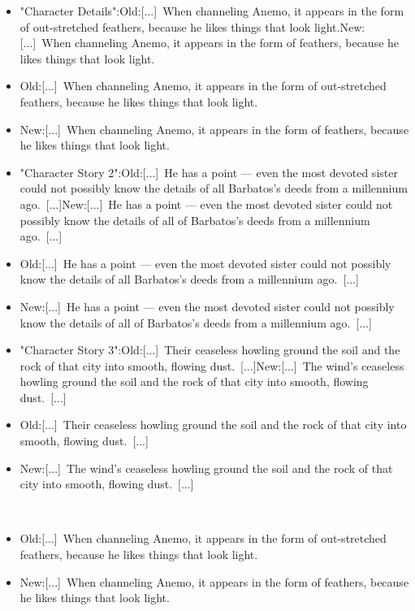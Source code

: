 \documentclass[a4paper,12pt]{article}
\begin{document}
\begin{itemize}
\item "Character Details":Old:[...] When channeling Anemo, it appears in the form of out-stretched feathers, because he likes things that look light.New:[...] When channeling Anemo, it appears in the form of feathers, because he likes things that look light.
\item Old:[...] When channeling Anemo, it appears in the form of out-stretched feathers, because he likes things that look light.
\item New:[...] When channeling Anemo, it appears in the form of feathers, because he likes things that look light.
\item "Character Story 2":Old:[...] He has a point — even the most devoted sister could not possibly know the details of all Barbatos's deeds from a millennium ago. [...]New:[...] He has a point — even the most devoted sister could not possibly know the details of all of Barbatos's deeds from a millennium ago. [...]
\item Old:[...] He has a point — even the most devoted sister could not possibly know the details of all Barbatos's deeds from a millennium ago. [...]
\item New:[...] He has a point — even the most devoted sister could not possibly know the details of all of Barbatos's deeds from a millennium ago. [...]
\item "Character Story 3":Old:[...] Their ceaseless howling ground the soil and the rock of that city into smooth, flowing dust. [...]New:[...] The wind's ceaseless howling ground the soil and the rock of that city into smooth, flowing dust. [...]
\item Old:[...] Their ceaseless howling ground the soil and the rock of that city into smooth, flowing dust. [...]
\item New:[...] The wind's ceaseless howling ground the soil and the rock of that city into smooth, flowing dust. [...]
\end{itemize}\\ \par \vspace{0.5cm}

\begin{itemize}
\item Old:[...] When channeling Anemo, it appears in the form of out-stretched feathers, because he likes things that look light.
\item New:[...] When channeling Anemo, it appears in the form of feathers, because he likes things that look light.
\end{itemize}\\ \par \vspace{0.5cm}
\end{document}
